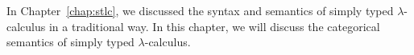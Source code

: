 \begin{comment}
syntax
  1. well-scoped, well-typed terms and substitutions
  2. equations
  3. normal forms + neutral terms

semantics
  1. - scwfs: motivation, compare with syntax
     - category of scwfs: morphisms are structure preserving maps or translations
  2. initial scwf: what is syntax categorically, theorem + (sketch of) proof
  3. CCCs: going from CCC to scwf -> semantics in CCCs
\end{comment}

\begin{comment}
Chap: Categorical semantics for lambda-calculus
Main goals: category of models, syntax is initial model
Why? needed for gluing which is categorical -> forward pointer to gluing proof, backward pointer to introduction
However: we look at a different syntax to motivate scwfs and for comparison with the previous syntax
\end{comment}


\begin{comment}
Forward pointers (notion of model/category of models, syntax is initial)

Key points
\begin{items}
\item why categorical semantics (provides a much wider range of interpretations for the $\lambda$-calculus, we need it for gluing proof which is categorical)
\item two ways of categorical semantics for $\lambda$-calculus (CCC, scwf), their relation (possible to convert between the two structures), why we use scwf (syntax of $\lambda$-calculus without product types is not an initial CCC)
\item different syntactic presentation, why (better suited for categorical treatment, motivation for scwfs i.e. notion of model, provide understanding by comparing it to previous syntax)
\end{items}
\end{comment}

In Chapter~\ref{chap:stlc}, we discussed the syntax and semantics of simply typed $\lambda$-calculus in a traditional way. In this chapter, we will discuss the categorical semantics of simply typed $\lambda$-calculus.

